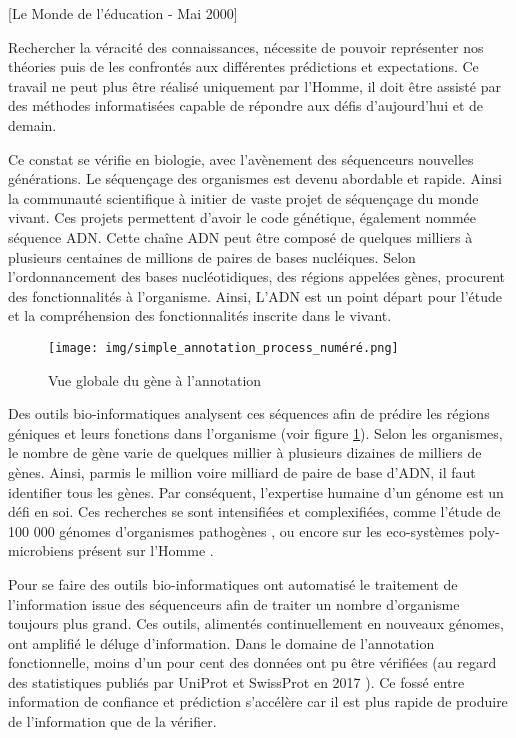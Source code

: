 [Le Monde de l'éducation - Mai 2000]

Rechercher la véracité des connaissances, nécessite de pouvoir représenter nos théories puis de les confrontés aux différentes prédictions et expectations. Ce travail ne peut plus être réalisé uniquement par l'Homme, il doit être assisté par des méthodes informatisées capable de répondre aux défis d'aujourd'hui et de demain.

Ce constat se vérifie en biologie, avec l'avènement des séquenceurs nouvelles générations. Le séquençage des organismes est devenu abordable et rapide. Ainsi la communauté scientifique à initier de vaste projet de séquençage du monde vivant. Ces projets permettent d'avoir le code génétique, également nommée séquence \gls{ADN}. Cette chaîne ADN peut être composé de quelques milliers à plusieurs centaines de millions de paires de bases nucléiques. Selon l'ordonnancement des bases nucléotidiques, des régions appelées gènes, procurent des fonctionnalités à l'organisme. Ainsi, L'ADN est un point départ pour l'étude et la compréhension des fonctionnalités inscrite dans le vivant.

\begin{figure}[!h]
    \centering
    \texttt{[image: img/simple\_annotation\_process\_numéré.png]}
    \caption{Vue globale du gène à l'annotation }
    \label{fig:glob_annotation}
\end{figure}

Des outils bio-informatiques analysent ces séquences afin de prédire les régions géniques et leurs fonctions dans l'organisme (voir figure \ref{fig:glob_annotation}). Selon les organismes, le nombre de gène varie de quelques millier à plusieurs dizaines de milliers de gènes. Ainsi, parmis le million voire milliard de paire de base d'ADN, il faut identifier tous les gènes. Par conséquent, l'expertise humaine d'un génome est un défi en soi. Ces recherches se sont intensifiées et complexifiées, comme l'étude de 100 000 génomes d'organismes pathogènes \citep[voir][]{100kfoodborne}, ou encore sur les eco-systèmes poly-microbiens présent sur l'Homme \citep[voir][]{hmp}.

Pour se faire des outils bio-informatiques ont automatisé le traitement de l'information issue des séquenceurs afin de traiter un nombre d'organisme toujours plus grand. Ces outils, alimentés continuellement en nouveaux génomes, ont amplifié le déluge d'information. Dans le domaine de l'annotation fonctionnelle, moins d'un pour cent des données ont pu être vérifiées (au regard des statistiques publiés par UniProt et SwissProt en 2017 \parencites{uniprot_stat}{expasy_stat} ). Ce fossé entre information de confiance et prédiction s'accélère car il est plus rapide de produire de l'information que de la vérifier.

